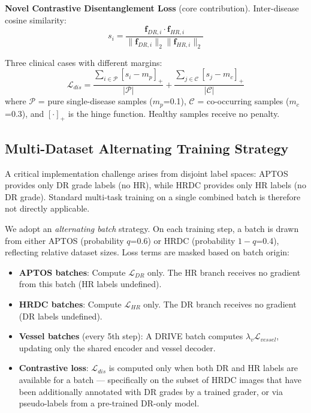 \documentclass[conference]{IEEEtran}
\begin{document}
\textbf{Novel Contrastive Disentanglement Loss} (core contribution). Inter-disease cosine similarity:
\begin{equation}
s_i = \frac{\mathbf{f}_{DR,i} \cdot \mathbf{f}_{HR,i}}{\|\mathbf{f}_{DR,i}\|_2 \|\mathbf{f}_{HR,i}\|_2}
\end{equation}

Three clinical cases with different margins:
\begin{equation}
\mathcal{L}_{dis} = \frac{\sum_{i \in \mathcal{P}}[s_i - m_p]_+}{|\mathcal{P}|} + \frac{\sum_{j \in \mathcal{C}}[s_j - m_c]_+}{|\mathcal{C}|}
\end{equation}
where $\mathcal{P}$ = pure single-disease samples ($m_p$=0.1), $\mathcal{C}$ = co-occurring samples ($m_c$=0.3), and $[\cdot]_+$ is the hinge function. Healthy samples receive no penalty.

\subsection{Multi-Dataset Alternating Training Strategy}

A critical implementation challenge arises from disjoint label spaces: APTOS provides only DR grade labels (no HR), while HRDC provides only HR labels (no DR grade). Standard multi-task training on a single combined batch is therefore not directly applicable.

We adopt an \textit{alternating batch} strategy. On each training step, a batch is drawn from either APTOS (probability $q$=0.6) or HRDC (probability $1-q$=0.4), reflecting relative dataset sizes. Loss terms are masked based on batch origin:

\begin{itemize}
    \item \textbf{APTOS batches}: Compute $\mathcal{L}_{DR}$ only. The HR branch receives no gradient from this batch (HR labels undefined).
    \item \textbf{HRDC batches}: Compute $\mathcal{L}_{HR}$ only. The DR branch receives no gradient (DR labels undefined).
    \item \textbf{Vessel batches} (every 5th step): A DRIVE batch computes $\lambda_v \mathcal{L}_{vessel}$, updating only the shared encoder and vessel decoder.
    \item \textbf{Contrastive loss}: $\mathcal{L}_{dis}$ is computed only when both DR and HR labels are available for a batch --- specifically on the subset of HRDC images that have been additionally annotated with DR grades by a trained grader, or via pseudo-labels from a pre-trained DR-only model.
\end{itemize}
\end{document}
